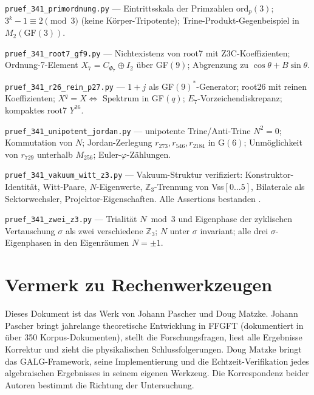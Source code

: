 \texttt{pruef\_341\_primordnung.py} --- Eintrittsskala der Primzahlen $\mathrm{ord}_p(3)$;
$3^k-1\equiv2\pmod 3$ (keine Körper-Tripotente); Trine-Produkt-Gegenbeispiel in $M_2(\text{GF}(3))$.

\texttt{pruef\_341\_root7\_gf9.py} --- Nichtexistenz von root7 mit Z3C-Koeffizienten;
Ordnung-7-Element $X_7=C_{\Phi_7}\oplus I_2$ über GF$(9)$; Abgrenzung zu $\cos\theta+B\sin\theta$.

\texttt{pruef\_341\_r26\_rein\_p27.py} --- $1+j$ als GF$(9)^*$-Generator; root26 mit reinen
Koeffizienten; $X^q=X\Leftrightarrow$ Spektrum in GF$(q)$; $E_7$-Vorzeichendiskrepanz; kompaktes root7 $Y^{26}$.

\texttt{pruef\_341\_unipotent\_jordan.py} --- unipotente Trine/Anti-Trine $N^2=0$;
Kommutation von $N$; Jordan-Zerlegung $r_{273},r_{546},r_{2184}$ in G$(6)$;
Unmöglichkeit von $r_{729}$ unterhalb $M_{256}$; Euler-$\varphi$-Zählungen.

\texttt{pruef\_341\_vakuum\_witt\_z3.py} --- Vakuum-Struktur verifiziert:
Konstruktor-Identität, Witt-Paare, $N$-Eigenwerte, $\mathbb{Z}_3$-Trennung
von Vss$[0\ldots5]$, Bilaterale als Sektorwechsler, Projektor-Eigenschaften.
Alle Assertions bestanden \BM.

\texttt{pruef\_341\_zwei\_z3.py} --- Trialität $N\bmod 3$ und Eigenphase der zyklischen
Vertauschung $\sigma$ als zwei verschiedene $\mathbb{Z}_3$; $N$ unter $\sigma$ invariant;
alle drei $\sigma$-Eigenphasen in den Eigenräumen $N=\pm1$.

\section*{Vermerk zu Rechenwerkzeugen}

Dieses Dokument ist das Werk von Johann Pascher und Doug Matzke.
Johann Pascher bringt jahrelange theoretische Entwicklung in FFGFT
(dokumentiert in über 350 Korpus-Dokumenten), stellt die Forschungsfragen,
liest alle Ergebnisse Korrektur und zieht die physikalischen Schlussfolgerungen.
Doug Matzke bringt das GALG-Framework, seine Implementierung und die
Echtzeit-Verifikation jedes algebraischen Ergebnisses in seinem eigenen Werkzeug.
Die Korrespondenz beider Autoren bestimmt die Richtung der Untersuchung.

